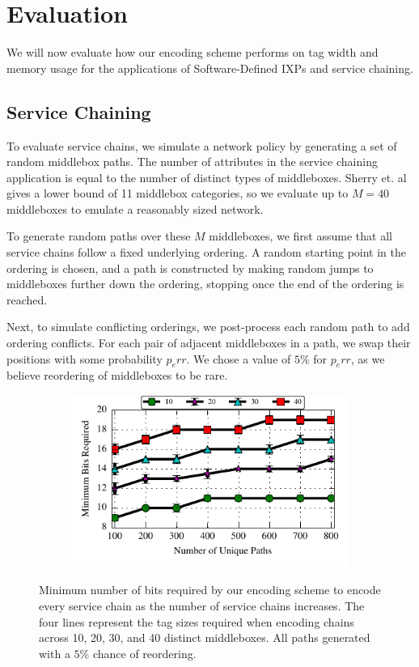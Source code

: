 \section{Evaluation} \label{sec:evaluation}
We will now evaluate how our encoding scheme performs on tag width and memory usage for the applications of Software-Defined IXPs and service chaining.

\subsection{Service Chaining}

To evaluate service chains, we simulate a network policy by generating a set of random middlebox paths. The number of attributes in the service chaining application is equal to the number of distinct types of middleboxes. Sherry et. al~\cite{Sherry:2012} gives a lower bound of 11 middlebox categories, so we evaluate up to $M = 40$ middleboxes to emulate a reasonably sized network. 

To generate random paths over these $M$ middleboxes, we first assume that all service chains follow a fixed underlying ordering. A random starting point in the ordering is chosen, and a path is constructed by making random jumps to middleboxes further down the ordering, stopping once the end of the ordering is reached.

Next, to simulate conflicting orderings, we post-process each random path to add ordering conflicts. For each pair of adjacent middleboxes in a path, we swap their positions with some probability $p_err$. We chose a value of $5\%$ for $p_err$, as we believe reordering of middleboxes to be rare. 

\begin{figure}[t!] 
\begin{minipage}{1\linewidth}
\begin{subfigure}[b]{0.96\linewidth}
\includegraphics[width=\linewidth]{figures/service_chaining_minbits}
\end{subfigure} 
\end{minipage} 
\caption{Minimum number of bits required by our encoding scheme to encode every service chain as the number of service chains increases. The four lines represent the tag sizes required when encoding chains across 10, 20, 30, and 40 distinct middleboxes. All paths generated with a $5\%$ chance of reordering.}
\label{fig:chain_bits}
\end{figure}

